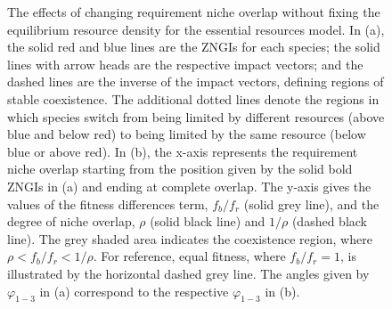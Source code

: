 \begin{figure}[H]
	\centering
	\caption[The effects of changing requirement niche overlap without fixing the equilibrium resource density for the essential resources model.]
		{\hspace{1mm}The effects of changing requirement niche overlap without fixing the equilibrium resource density for the essential resources model. In (a), the solid red and blue lines are the ZNGIs for each species; the solid lines with arrow heads are the respective impact vectors; and the dashed lines are the inverse of the impact vectors, defining regions of stable coexistence. The additional dotted lines denote the regions in which species switch from being limited by different resources (above blue and below red) to being limited by the same resource (below blue or above red). In (b), the x-axis represents the requirement niche overlap starting from the position given by the solid bold ZNGIs in (a) and ending at complete overlap. The y-axis gives the values of the fitness differences term, $f_{b}/f_{r}$ (solid grey line), and the degree of niche overlap, $\rho$ (solid black line) and $1/\rho$ (dashed black line). The grey shaded area indicates the coexistence region, where $\rho<f_{b}/f_{r}<1/\rho$. For reference, equal fitness, where $f_{b}/f_{r}=1$, is illustrated by the horizontal dashed grey line. The angles given by $\varphi_{1-3}$ in (a) correspond to the respective $\varphi_{1-3}$ in (b).}
	\label{fig:require-appendix-fig-notfix}
\end{figure}

